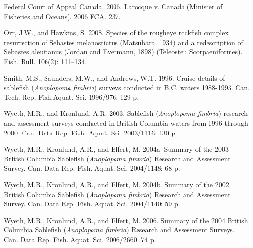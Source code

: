 \documentclass[12pt]{article}\usepackage[]{graphicx}\usepackage[]{color}
\begin{document}
\leavevmode\hypertarget{ref-Larocque2006}{}%
Federal Court of Appeal Canada. 2006. Larocque v. Canada (Minister of Fisheries and Oceans). 2006 FCA. 237.

\leavevmode\hypertarget{ref-Orr2008}{}%
Orr, J.W., and Hawkins, S. 2008. Species of the rougheye rockfish complex resurrection of Sebastes melanostictus (Matsubara, 1934) and a redescription of Sebastes aleutianus (Jordan and Evermann, 1898) (Teleostei: Scorpaeniformes). Fish. Bull. 106(2): 111--134.

\leavevmode\hypertarget{ref-Smith1996}{}%
Smith, M.S., Saunders, M.W., and Andrews, W.T. 1996. Cruise details of sablefish (\emph{Anoplopoma fimbria}) surveys conducted in B.C. waters 1988-1993. Can. Tech. Rep. Fish.Aquat. Sci. 1996/976: 129 p.

\leavevmode\hypertarget{ref-Wyeth2003}{}%
Wyeth, M.R., and Kronlund, A.R. 2003. Sablefish (\emph{Anoplopoma fimbria}) research and assessment surveys conducted in British Columbia waters from 1996 through 2000. Can. Data Rep. Fish. Aquat. Sci. 2003/1116: 130 p.

\leavevmode\hypertarget{ref-Wyeth2004b}{}%
Wyeth, M.R., Kronlund, A.R., and Elfert, M. 2004a. Summary of the 2003 British Columbia Sablefish (\emph{Anoplopoma fimbria}) Research and Assessment Survey. Can. Data Rep. Fish. Aquat. Sci. 2004/1148: 68 p.

\leavevmode\hypertarget{ref-Wyeth2004a}{}%
Wyeth, M.R., Kronlund, A.R., and Elfert, M. 2004b. Summary of the 2002 British Columbia Sablefish (\emph{Anoplopoma fimbria}) Research and Assessment Survey. Can. Data Rep. Fish. Aquat. Sci. 2004/1140: 59 p.

\leavevmode\hypertarget{ref-Wyeth2006}{}%
Wyeth, M.R., Kronlund, A.R., and Elfert, M. 2006. Summary of the 2004 British Columbia Sablefish (\emph{Anoplopoma fimbria}) Research and Assessment Surveys. Can. Data Rep. Fish. Aquat. Sci. 2006/2660: 74 p.
\end{document}
